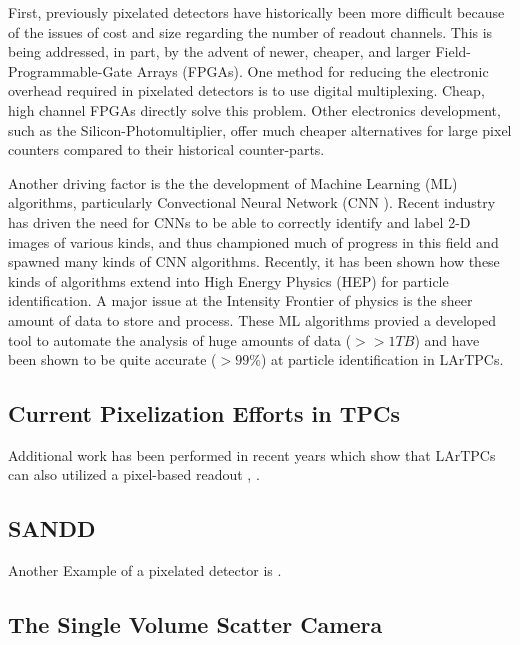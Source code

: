 First, previously pixelated detectors have historically been more difficult because of the issues of cost and size regarding the number of readout channels.
This is being addressed, in part, by the advent of newer, cheaper, and larger Field-Programmable-Gate Arrays (FPGAs).
One method for reducing the electronic overhead required in pixelated detectors is to use digital multiplexing.
Cheap, high channel FPGAs directly solve this problem. 
Other electronics development, such as the Silicon-Photomultiplier, offer much cheaper alternatives for large pixel counters compared to their historical counter-parts. 

\citep{Sadowski_2017}
Another driving factor is the the development of Machine Learning (ML) algorithms, particularly Convectional Neural Network (CNN \citep{Sadowski2017DeepLI}). 
Recent industry has driven the need for CNNs to be able to correctly identify and label 2-D images of various kinds, and thus championed much of progress in this field and spawned many kinds of CNN algorithms. 
Recently, it has been shown how these kinds of algorithms extend into High Energy Physics (HEP) for particle identification.
A major issue at the Intensity Frontier of physics is the sheer amount of data to store and process. 
These ML algorithms provied a developed tool to automate the analysis of huge amounts of data ($>> 1 TB$) and have been shown to be quite accurate ($>99\%$) at particle identification in LArTPCs.

\subsection{Current Pixelization Efforts in TPCs}


Additional work has been performed in recent years which show that LArTPCs can also utilized a pixel-based readout \citep{larpix:Dwyer_2018}, \citep{Asaadi_2018}.

\subsection{SANDD}

Another Example of a pixelated detector is \citep{SUTANTO2021_sandd_165409}.


\subsection{The Single Volume Scatter Camera}

